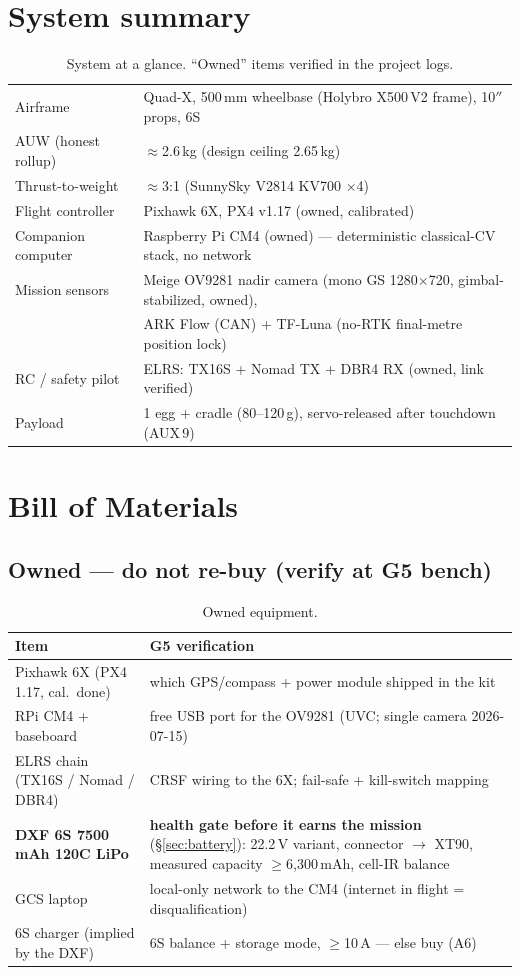 \documentclass[11pt,a4paper]{article}
\newcommand{\warn}[1]{\textcolor{red!70!black}{\textbf{#1}}}
\begin{document}
\section{System summary}
\begin{table}[H]\centering\small
\begin{tabular}{@{}ll@{}}
\toprule
Airframe & Quad-X, 500\,mm wheelbase (Holybro X500\,V2 frame), 10$''$ props, 6S \\
AUW (honest rollup) & $\approx$2.6\,kg (design ceiling 2.65\,kg) \\
Thrust-to-weight & $\approx$3:1 (SunnySky V2814 KV700 $\times$4) \\
Flight controller & Pixhawk 6X, PX4 v1.17 (owned, calibrated) \\
Companion computer & Raspberry Pi CM4 (owned) --- deterministic classical-CV stack, no network \\
Mission sensors & Meige OV9281 nadir camera (mono GS 1280$\times$720, gimbal-stabilized, owned), \\
 & ARK Flow (CAN) + TF-Luna (no-RTK final-metre position lock) \\
RC / safety pilot & ELRS: TX16S + Nomad TX + DBR4 RX (owned, link verified) \\
Payload & 1 egg + cradle (80--120\,g), servo-released after touchdown (AUX\,9) \\
\bottomrule
\end{tabular}
\caption{System at a glance. ``Owned'' items verified in the project logs.}
\end{table}

\section{Bill of Materials}
\subsection{Owned --- do not re-buy (verify at G5 bench)}
\begin{table}[H]\centering\small
\begin{tabularx}{\textwidth}{@{}lX@{}}
\toprule
\textbf{Item} & \textbf{G5 verification} \\
\midrule
Pixhawk 6X (PX4 1.17, cal.\ done) & which GPS/compass + power module shipped in the kit \\
RPi CM4 + baseboard & free USB port for the OV9281 (UVC; single camera 2026-07-15) \\
ELRS chain (TX16S / Nomad / DBR4) & CRSF wiring to the 6X; fail-safe + kill-switch mapping \\
\textbf{DXF 6S 7500\,mAh 120C LiPo} & \warn{health gate before it earns the mission} (\S\ref{sec:battery}): 22.2\,V variant, connector $\to$ XT90, measured capacity $\ge$6{,}300\,mAh, cell-IR balance \\
GCS laptop & local-only network to the CM4 (internet in flight = disqualification) \\
6S charger (implied by the DXF) & 6S balance + storage mode, $\ge$10\,A --- else buy (A6) \\
\bottomrule
\end{tabularx}
\caption{Owned equipment.}
\end{table}
\end{document}
